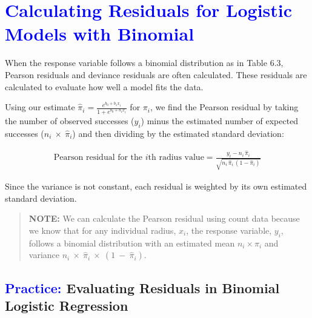 \documentclass[
]{report}
\begin{document}
\hypertarget{section-72}{%
\section{\texorpdfstring{\textcolor{blue}{ Calculating Residuals for Logistic Models with Binomial }}{}}\label{section-72}}

When the response variable follows a binomial distribution as in Table 6.3, Pearson residuals and deviance residuals are often calculated. These residuals are calculated to evaluate how well a model fits the data.

Using our estimate \(\hat{\pi}_i = \frac{e^{b_0 + b_1 x_i}}{1 + e^{b_0 + b_1 x_i}}\) for \(\scriptstyle \pi_i\), we find the Pearson residual by taking the number of observed successes (\(\scriptstyle y_i\)) minus the estimated number of expected successes (\(\scriptstyle n_i \  \times \ \hat\pi_i\)) and then dividing by the estimated standard deviation:

\begin{align}
\text{Pearson residual for the $\scriptstyle i$th radius value}
= \frac{y_i - n_i \,\hat\pi_i}{\sqrt{n_i \,\hat\pi_i\,(1 - \hat\pi_i)}}
\tag{6.23}
\end{align}

Since the variance is not constant, each residual is weighted by its own estimated standard deviation.

\begin{quote}
\textbf{NOTE:} We can calculate the Pearson residual using count data because we know that for any individual radius, \(\scriptstyle x_i\), the response variable, \(\scriptstyle y_i\), follows a binomial distribution with an estimated mean \(\scriptstyle n_i \times \hat\pi_i\) and variance \(\scriptstyle n_i \  \times \  \hat\pi_i \  \times \  (1 \ -\  \hat\pi_i)\).
\end{quote}

\hypertarget{evaluating-residuals-in-binomial-logistic-regression}{%
\subsection*{\texorpdfstring{\textcolor{blue}{Practice:} Evaluating Residuals in Binomial Logistic Regression}{ Evaluating Residuals in Binomial Logistic Regression}}\label{evaluating-residuals-in-binomial-logistic-regression}}

\vspace{-1em}
\end{document}
